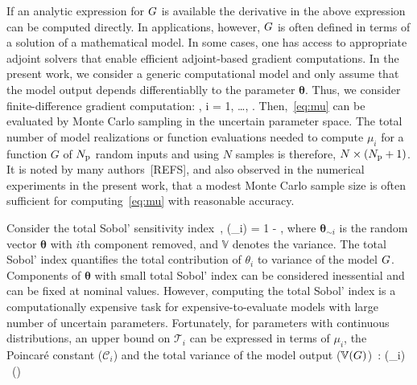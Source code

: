 If an analytic expression for $G$ is available the derivative in the above
expression can be computed directly. In applications, however, $G$ is often
defined in terms of a solution of a mathematical model. In some cases, 
one has access to appropriate adjoint solvers that enable efficient
adjoint-based gradient computations. In the present work, we consider
a generic computational model and only assume that the model
output depends differentiablly to the parameter $\bm{\theta}$. Thus, 
we consider finite-difference gradient computation: 
\be
{} 
\approx
{}, \quad i = 1, \ldots, \Np. 
\label{eq:partial}
\ee
Then,~\eqref{eq:mu} can be evaluated by Monte Carlo sampling in
the uncertain parameter space. 
The total number of model realizations or function evaluations
needed to
compute $\mu_i$ for a function $G$ of ${N_\text{p}}$ random inputs and using $N$ samples is
therefore, $N\times({N_\text{p}}+1)$. 
It is noted by many authors~[REFS], and also observed
in the numerical experiments in the present work, that a modest Monte Carlo
sample size is often sufficient for computing~\eqref{eq:mu} with reasonable
accuracy.

Consider the total 
Sobol' sensitivity index~\cite{Sobol:2001},
\be
{}(\theta_i) = 1 - 
,
\label{eq:total}
\ee
where $\bm{\theta}_{\sim i}$ is the random vector $\bm\theta$ with $i$th component removed, 
and $\mathbb{V}$ denotes the variance. The total Sobol' index quantifies the total contribution 
of $\theta_i$ to variance of the model $G$. Components of $\bm\theta$ with small 
total Sobol' index can be considered inessential and can be fixed at nominal values. However, 
computing the total Sobol' index is a computationally expensive task for expensive-to-evaluate 
models with large number of uncertain parameters. Fortunately, 
for parameters with continuous distributions, an upper bound on $\mathcal{T}_i$  
can be expressed in terms of $\mu_i$, the Poincar\'e constant ($\mathcal{C}_i$) and the total 
variance of the model output ($\mathbb{V}(G)$)~\cite{Lamboni:2013}:
\be
{}(\theta_i) \leq {}~(\propto {})
\label{eq:bound}
\ee

